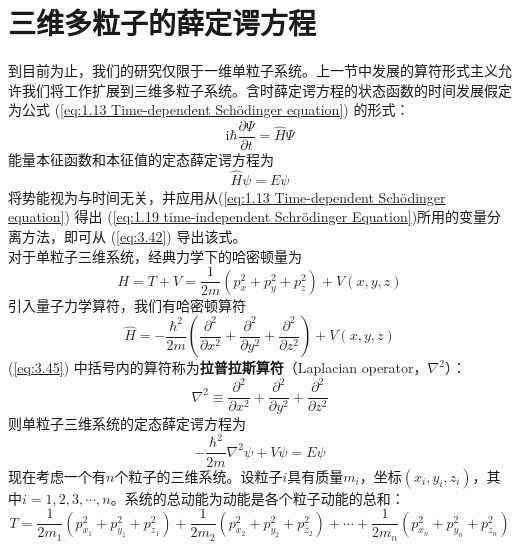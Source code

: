 \section{三维多粒子的薛定谔方程}
	到目前为止，我们的研究仅限于一维单粒子系统。上一节中发展的算符形式主义允许我们将工作扩展到三维多粒子系统。含时薛定谔方程的状态函数的时间发展假定为公式 (\ref{eq:1.13 Time-dependent Schödinger equation}) 的形式：
	\begin{equation}
		\boxed{
			\mathrm{i}\hbar\frac{\partial \Psi}{\partial t} = \hat{H}\Psi
		}
		\label{eq:3.42}
	\end{equation}
	能量本征函数和本征值的定态薛定谔方程为
	\begin{equation}
		\boxed{
			\hat{H}\psi = E\psi
		}
		\label{eq:3.43}
	\end{equation}
	将势能视为与时间无关，并应用从(\ref{eq:1.13 Time-dependent Schödinger equation}) 得出 (\ref{eq:1.19 time-independent Schrödinger Equation})所用的变量分离方法，即可从 (\ref{eq:3.42}) 导出该式。\\
	\indent 对于单粒子三维系统，经典力学下的哈密顿量为
	\begin{equation}
		H = T + V = \frac{1}{2m}\left(p_x^2+p_y^2+p_z^2\right)+V\left(x,y,z\right)
		\label{eq:3.44}
	\end{equation}
	引入量子力学算符，我们有哈密顿算符
	\begin{equation}
		\hat{H} = -\frac{\hbar^2}{2m}\left(\frac{\partial^2}{\partial x^2}+\frac{\partial^2}{\partial y^2}+\frac{\partial^2}{\partial z^2}\right)+V\left(x,y,z\right)
		\label{eq:3.45}
	\end{equation}
	(\ref{eq:3.45}) 中括号内的算符称为\textbf{拉普拉斯算符}（Laplacian operator，$\nabla^2$）：
	\begin{equation}
		\boxed{
			\nabla^2 \equiv \frac{\partial^2}{\partial x^2} + \frac{\partial^2}{\partial y^2} + \frac{\partial^2}{\partial z^2}
		}
		\label{eq:3.46}
	\end{equation}
	则单粒子三维系统的定态薛定谔方程为
	\begin{equation}
		-\frac{\hbar^2}{2m}\nabla^2\psi + V\psi = E\psi
		\label{eq:3.47}
	\end{equation}
	\indent 现在考虑一个有$n$个粒子的三维系统。设粒子$i$具有质量$m_i$，坐标$\left(x_i,y_i,z_i\right)$，其中$i = 1,2,3,\cdots,n$。系统的总动能为动能是各个粒子动能的总和：
	\begin{equation*}
		T = \frac{1}{2m_1}\left(p_{x_1}^2+p_{y_z}^2+p_{z_1}^2\right) + \frac{1}{2m_2}\left(p_{x_2}^2+p_{y_2}^2+p_{z_2}^2\right) + \cdots + \frac{1}{2m_n}\left(p_{x_n}^2+p_{y_n}^2+p_{z_n}^2\right)
	\end{equation*}
